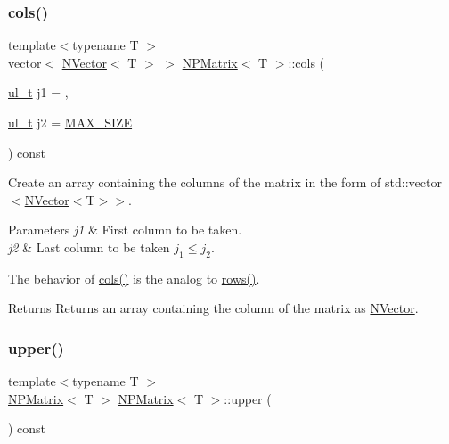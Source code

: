 \subsubsection{\texorpdfstring{cols()}{cols()}}
{\footnotesize\ttfamily template$<$typename T $>$ \\
vector$<$ \mbox{\hyperlink{class_n_vector}{N\+Vector}}$<$ T $>$ $>$ \mbox{\hyperlink{class_n_p_matrix}{N\+P\+Matrix}}$<$ T $>$\+::cols (\begin{DoxyParamCaption}\item[{\mbox{\hyperlink{typedef_8h_a1b140a2034db3f5dfe18a987745df43a}{ul\+\_\+t}}}]{j1 = {},  }\item[{\mbox{\hyperlink{typedef_8h_a1b140a2034db3f5dfe18a987745df43a}{ul\+\_\+t}}}]{j2 = {\ttfamily \mbox{\hyperlink{_n_vector_8h_a0592dba56693fad79136250c11e5a7fe}{M\+A\+X\+\_\+\+S\+I\+ZE}}} }\end{DoxyParamCaption}) const}



Create an array containing the columns of the matrix in the form of {\ttfamily std\+::vector$<$\mbox{\hyperlink{class_n_vector}{N\+Vector}}$<$T$>$$>$}. 


\begin{DoxyParams}{Parameters}
{\em j1} & First column to be taken. \\
\hline
{\em j2} & Last column to be taken $ j_1 \leq j_2 $.\\
\hline
\end{DoxyParams}
The behavior of {\ttfamily \mbox{\hyperlink{class_n_p_matrix_a30c8ad7b415fa92a23375cbad3ee8e37}{cols()}}} is the analog to {\ttfamily \mbox{\hyperlink{class_n_p_matrix_add861e9e1df81af2546c3eab1fd40d51}{rows()}}}.

\begin{DoxyReturn}{Returns}
Returns an array containing the column of the matrix as {\ttfamily \mbox{\hyperlink{class_n_vector}{N\+Vector}}}. 
\end{DoxyReturn}
\mbox{\label{class_n_p_matrix_a986376cd2765f1864fdac8b264f454ef}} 
\subsubsection{\texorpdfstring{upper()}{upper()}}
{\footnotesize\ttfamily template$<$typename T $>$ \\
\mbox{\hyperlink{class_n_p_matrix}{N\+P\+Matrix}}$<$ T $>$ \mbox{\hyperlink{class_n_p_matrix}{N\+P\+Matrix}}$<$ T $>$\+::upper (\begin{DoxyParamCaption}{ }\end{DoxyParamCaption}) const}



